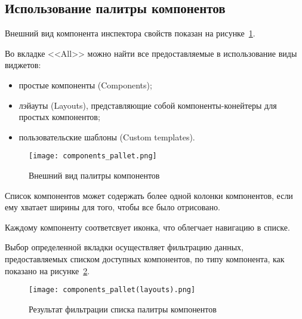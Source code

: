 \subsection{Использование палитры компонентов}
\label{sec:manual:pallet_manual}

Внешний вид компонента инспектора свойств показан на рисунке~\ref{sec:manual:components_pallet}.

Во вкладке <<All>> можно найти все предоставляемые в использование виды виджетов:
\begin{itemize}
  \item простые компоненты (Components);
  \item лэйауты (Layouts), представляющие собой компоненты-конейтеры для простых компонентов;
  \item пользовательские шаблоны (Custom templates).
\end{itemize}

\begin{figure}[ht]
  \centering
    \texttt{[image: components\_pallet.png]}
    \caption{Внешний вид палитры компонентов}
    \label{sec:manual:components_pallet}
\end{figure}

Список компонентов может содержать более одной колонки компонентов, если ему хватает ширины для того, чтобы все было отрисовано.

Каждому компоненту соответсвует иконка, что облегчает навигацию в списке.\pagebreak

Выбор определенной вкладки осуществляет фильтрацию данных, предоставляемых списком доступных компонентов, по типу компонента, как показано на рисунке~\ref{sec:manual:components_pallet_layouts}.

\begin{figure}[ht]
  \centering
    \texttt{[image: components\_pallet(layouts).png]}
    \caption{Результат фильтрации списка палитры компонентов}
    \label{sec:manual:components_pallet_layouts}
\end{figure}

